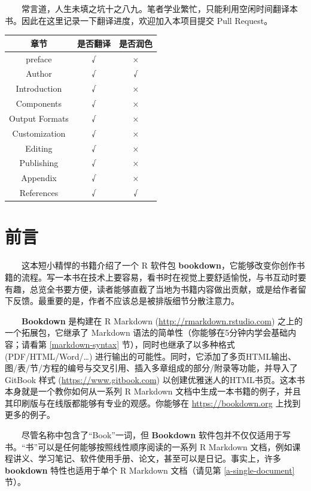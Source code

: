 \documentclass[
  12pt,
]{krantz}
\theoremstyle{definition}
\theoremstyle{definition}
\theoremstyle{definition}
\theoremstyle{definition}
\theoremstyle{remark}
\begin{document}
  常言道，人生未填之坑十之八九。笔者学业繁忙，只能利用空闲时间翻译本书。因此在这里记录一下翻译进度，欢迎加入本项目提交 Pull Request。

\begin{longtable}[]{@{}ccc@{}}
\toprule\noalign{}
章节 & 是否翻译 & 是否润色 \\
\midrule\noalign{}
\endhead
\bottomrule\noalign{}
\endlastfoot
preface & √ & × \\
Author & √ & √ \\
Introduction & √ & × \\
Components & √ & × \\
Output Formats & √ & × \\
Customization & √ & × \\
Editing & √ & × \\
Publishing & √ & × \\
Appendix & √ & × \\
References & √ & √ \\
\end{longtable}

\hypertarget{ux524dux8a00}{%
\chapter*{前言}\label{ux524dux8a00}}


  这本短小精悍的书籍介绍了一个 R 软件包 \textbf{bookdown}，它能够改变你创作书籍的流程。写一本书在技术上要容易，看书时在视觉上要舒适愉悦，与书互动时要有趣，总览全书要方便，读者能够直截了当地为书籍内容做出贡献，或是给作者留下反馈。最重要的是，作者不应该总是被排版细节分散注意力。

  \textbf{Bookdown} 是构建在 R Markdown (\url{http://rmarkdown.rstudio.com}) 之上的一个拓展包，它继承了 Markdown 语法的简单性（你能够在5分钟内学会基础内容；请看第 \ref{markdown-syntax} 节），同时也继承了以多种格式 (PDF/HTML/Word/\ldots) 进行输出的可能性。同时，它添加了多页HTML输出、图/表/节/方程的编号与交叉引用、插入多章组成的部分/附录等功能，并导入了 GitBook 样式 (\url{https://www.gitbook.com}) 以创建优雅迷人的HTML书页。这本书本身就是一个教你如何从一系列 R Markdown 文档中生成一本书籍的例子，并且其印刷版与在线版都能够有专业的观感。你能够在 \url{https://bookdown.org} 上找到更多的例子。

  尽管名称中包含了``Book''一词，但 \textbf{Bookdown} 软件包并不仅仅适用于写书。``书''可以是任何能够按照线性顺序阅读的一系列 R Markdown 文档，例如课程讲义、学习笔记、软件使用手册、论文，甚至可以是日记。事实上，许多 \textbf{bookdown} 特性也适用于单个 R Markdown 文档（请见第 \ref{a-single-document} 节）。
\end{document}
